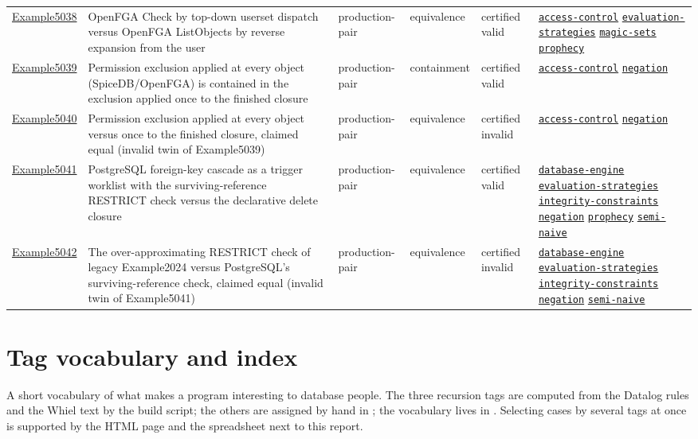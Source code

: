 \documentclass[10pt]{article}
\begin{document}
\begin{longtable}{@{}lp{}p{}p{}p{}p{}@{}}
\hyperref[case:Example5038]{Example5038} & OpenFGA Check by top-down userset dispatch versus OpenFGA ListObjects by reverse expansion from the user & production-pair & equivalence & certified valid & {\scriptsize \hyperref[tag:access-control]{\texttt{access-control}} \hyperref[tag:evaluation-strategies]{\texttt{evaluation-strategies}} \hyperref[tag:magic-sets]{\texttt{magic-sets}} \hyperref[tag:prophecy]{\texttt{prophecy}}} \\
\hyperref[case:Example5039]{Example5039} & Permission exclusion applied at every object (SpiceDB/OpenFGA) is contained in the exclusion applied once to the finished closure & production-pair & containment & certified valid & {\scriptsize \hyperref[tag:access-control]{\texttt{access-control}} \hyperref[tag:negation]{\texttt{negation}}} \\
\hyperref[case:Example5040]{Example5040} & Permission exclusion applied at every object versus once to the finished closure, claimed equal (invalid twin of Example5039) & production-pair & equivalence & certified invalid & {\scriptsize \hyperref[tag:access-control]{\texttt{access-control}} \hyperref[tag:negation]{\texttt{negation}}} \\
\hyperref[case:Example5041]{Example5041} & PostgreSQL foreign-key cascade as a trigger worklist with the surviving-reference RESTRICT check versus the declarative delete closure & production-pair & equivalence & certified valid & {\scriptsize \hyperref[tag:database-engine]{\texttt{database-engine}} \hyperref[tag:evaluation-strategies]{\texttt{evaluation-strategies}} \hyperref[tag:integrity-constraints]{\texttt{integrity-constraints}} \hyperref[tag:negation]{\texttt{negation}} \hyperref[tag:prophecy]{\texttt{prophecy}} \hyperref[tag:semi-naive]{\texttt{semi-naive}}} \\
\hyperref[case:Example5042]{Example5042} & The over-approximating RESTRICT check of legacy Example2024 versus PostgreSQL's surviving-reference check, claimed equal (invalid twin of Example5041) & production-pair & equivalence & certified invalid & {\scriptsize \hyperref[tag:database-engine]{\texttt{database-engine}} \hyperref[tag:evaluation-strategies]{\texttt{evaluation-strategies}} \hyperref[tag:integrity-constraints]{\texttt{integrity-constraints}} \hyperref[tag:negation]{\texttt{negation}} \hyperref[tag:semi-naive]{\texttt{semi-naive}}} \\
\bottomrule
\end{longtable}

\section{Tag vocabulary and index}\label{sec:tags}
A short vocabulary of what makes a program interesting to database people. The three recursion tags are computed from the Datalog rules and the Whiel text by the build script; the others are assigned by hand in ; the vocabulary lives in . Selecting cases by several tags at once is supported by the HTML page and the spreadsheet next to this report.
\end{document}
